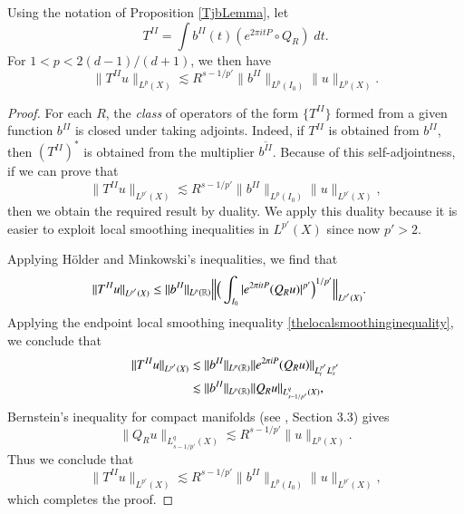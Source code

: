 \begin{lemma} \label{LocalSmoothingLargeTimesTheorem}
    Using the notation of Proposition \ref{TjbLemma}, let
    \[ T^{II} = \int b^{II}(t) (e^{2 \pi i t P} \circ Q_R)\; dt. \]
    For $1 < p < 2 (d-1)/(d+1)$, we then have
    \[ \| T^{II} u \|_{L^p(X)} \lesssim R^{s - 1/p'} \| b^{II} \|_{L^p(I_0)} \| u \|_{L^p(X)}. \]
\end{lemma}
\begin{proof}
    For each $R$, the \emph{class} of operators of the form $\{ T^{II} \}$ formed from a given function $b^{II}$ is closed under taking adjoints. Indeed, if $T^{II}$ is obtained from $b^{II}$, then $(T^{II})^*$ is obtained from the multiplier $\overline{b^{II}}$. Because of this self-adjointness, if we can prove that
    \begin{equation}
        \| T^{II} u \|_{L^{p'}(X)} \lesssim R^{s - 1/p'} \| b^{II} \|_{L^p(I_0)} \| u \|_{L^{p'}(X)},
    \end{equation}
    then we obtain the required result by duality. We apply this duality because it is easier to exploit local smoothing inequalities in $L^{p'}(X)$ since now $p' > 2$.

    Applying H\"{o}lder and Minkowski's inequalities, we find that
    \begin{equation}
    \begin{split}
        \| T^{II}u \|_{L^{p'}(X)} &\leq \| b^{II} \|_{L^p(\operatorname{\mathbb{R}})} \Big\| \Big( \int_{I_0} |e^{2 \pi i t P} (Q_R u)|^{p'} \Big)^{1/p'} \Big\|_{L^{p'}(X)}.
    \end{split}
    \end{equation}
    Applying the endpoint local smoothing inequality \eqref{thelocalsmoothinginequality}, we conclude that
    \begin{equation}
    \begin{split}
        \| T^{II} u \|_{L^{p'}(X)} &\lesssim \| b^{II} \|_{L^p(\operatorname{\mathbb{R}})}  \| e^{2 \pi i P} (Q_R u) \|_{L^{p'}_t L^{p'}_x}\\
        &\lesssim  \| b^{II} \|_{L^p(\operatorname{\mathbb{R}})}  \| Q_R u \|_{L^q_{s - 1/p'}(X)},
    \end{split}
    \end{equation}
    Bernstein's inequality for compact manifolds (see \cite{Sogge}, Section 3.3) gives
    \begin{equation}
        \| Q_R u \|_{L^{q}_{s - 1/p'}(X)} \lesssim R^{s - 1/p'} \| u \|_{L^p(X)}.
    \end{equation}
    Thus we conclude that
    \begin{equation}
        \| T^{II}u \|_{L^{p'}(X)} \lesssim R^{s - 1/p'} \| b^{II} \|_{L^p(I_0)} \| u \|_{L^{p'}(X)},
    \end{equation}
    which completes the proof.
\end{proof}

